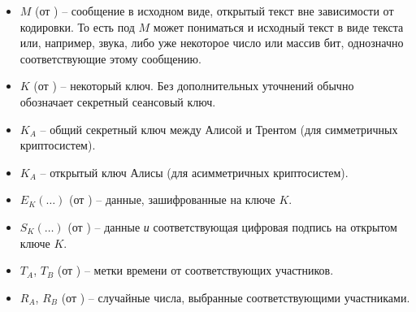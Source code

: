 \begin{itemize}
	\item $M$ (от ) -- сообщение в исходном виде, открытый текст вне зависимости от кодировки. То есть под $M$ может пониматься и исходный текст в виде текста или, например, звука, либо уже некоторое число или массив бит, однозначно соответствующие этому сообщению.
	\item $K$ (от ) -- некоторый ключ. Без дополнительных уточнений обычно обозначает секретный сеансовый ключ.
	\item $K_A$ -- общий секретный ключ между Алисой и Трентом (для симметричных криптосистем).
	\item $K_A$ -- открытый ключ Алисы (для асимметричных криптосистем).
	\item $E_K \left( \dots \right)$ (от ) -- данные, зашифрованные на ключе $K$.
	\item $S_K \left( \dots \right)$ (от ) -- данные \emph{и} соответствующая цифровая подпись на открытом ключе $K$.
	\item $T_A$, $T_B$ (от ) -- метки времени от соответствующих участников.
	\item $R_A$, $R_B$ (от ) -- случайные числа, выбранные соответствующими участниками.
\end{itemize}
